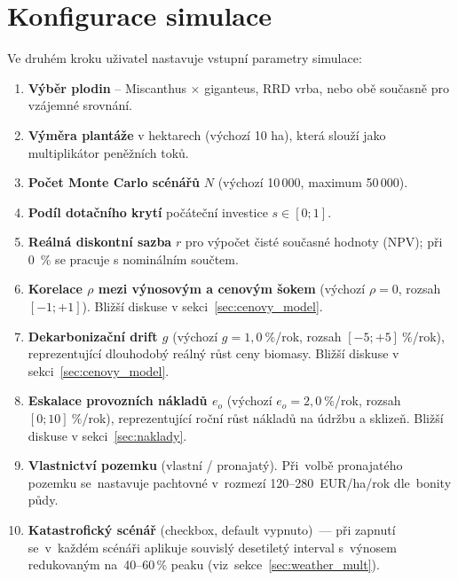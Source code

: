 \section{Konfigurace simulace}
\label{sec:konfigurace}

Ve druhém kroku uživatel nastavuje vstupní parametry simulace:
\begin{enumerate}
    \item \textbf{Výběr plodin} -- Miscanthus $\times$ giganteus, RRD vrba,
          nebo obě současně pro vzájemné srovnání.
    \item \textbf{Výměra plantáže} v hektarech (výchozí 10 ha), která slouží
          jako multiplikátor peněžních toků.
    \item \textbf{Počet Monte Carlo scénářů} $N$ (výchozí 10\,000, maximum 50\,000).
    \item \textbf{Podíl dotačního krytí} počáteční investice $s \in [0; 1]$.
    \item \textbf{Reálná diskontní sazba} $r$ pro výpočet čisté současné hodnoty
          (NPV); při 0~\% se pracuje s nominálním součtem.
    \item \textbf{Korelace $\rho$ mezi výnosovým a cenovým šokem}
          (výchozí $\rho = 0$, rozsah $[-1; +1]$). Bližší diskuse v sekci~\ref{sec:cenovy_model}.
    \item \textbf{Dekarbonizační drift $g$} (výchozí $g = 1{,}0~\%$/rok,
          rozsah $[-5; +5]~\%$/rok), reprezentující dlouhodobý reálný růst
          ceny biomasy. Bližší diskuse v sekci~\ref{sec:cenovy_model}.
    \item \textbf{Eskalace provozních nákladů $e_o$} (výchozí $e_o = 2{,}0~\%$/rok,
          rozsah $[0; 10]~\%$/rok), reprezentující roční růst nákladů na
          údržbu a sklizeň. Bližší diskuse v sekci~\ref{sec:naklady}.
    \item \textbf{Vlastnictví pozemku} (vlastní / pronajatý). Při~volbě
          pronajatého pozemku se~nastavuje pachtovné v~rozmezí
          120--280~EUR/ha/rok dle~bonity půdy.
    \item \textbf{Katastrofický scénář} (checkbox, default vypnuto)~---
          při zapnutí se~v~každém scénáři aplikuje souvislý desetiletý
          interval s~výnosem redukovaným na~40--60\,\% peaku
          (viz~sekce~\ref{sec:weather_mult}).

\end{enumerate}

